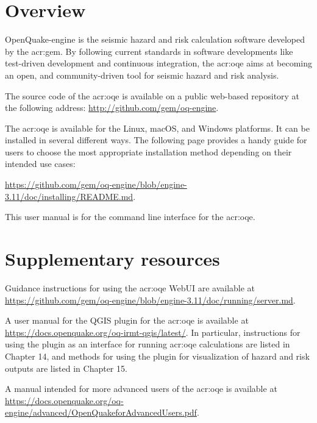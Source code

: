 \section{Overview}

OpenQuake-engine is the seismic hazard and risk calculation software developed by
the \glsdesc{acr:gem}. By following current standards in software
developments like test-driven development and continuous integration, the
\glsdesc{acr:oqe} aims at becoming an open, and community-driven tool for
seismic hazard and risk analysis.

The source code of the \glsdesc{acr:oqe} is available on a public web-based
repository at the following address:
\href{http://github.com/gem/oq-engine}{http://github.com/gem/oq-engine}.

The \glsdesc{acr:oqe} is available for the Linux, macOS, and Windows
platforms. It can be installed in several different ways. The following page
provides a handy guide for users to choose the most appropriate installation
method depending on their intended use cases:

\href{https://github.com/gem/oq-engine/blob/engine-3.11/doc/installing/README.md}{https://github.com/gem/oq-engine/blob/engine-3.11/doc/installing/README.md}.

This user manual is for the command line interface for the \glsdesc{acr:oqe}.


\section{Supplementary resources}

Guidance instructions for using the \glsdesc{acr:oqe} WebUI are available 
at \href{https://github.com/gem/oq-engine/blob/engine-3.11/doc/running/server.md}{https://github.com/gem/oq-engine/blob/engine-3.11/doc/running/server.md}.

A user manual for the QGIS plugin for the \glsdesc{acr:oqe} is available at 
\href{https://docs.openquake.org/oq-irmt-qgis/latest/}{https://docs.openquake.org/oq-irmt-qgis/latest/}. 
In particular, instructions for using the plugin as an interface for running \glsdesc{acr:oqe}
calculations are listed in Chapter 14, and methods for using the plugin for visualization 
of hazard and risk outputs are listed in Chapter 15.

A manual intended for more advanced users of the \glsdesc{acr:oqe} is available
at \href{https://docs.openquake.org/oq-engine/advanced/OpenQuakeforAdvancedUsers.pdf}{https://docs.openquake.org/oq-engine/advanced/OpenQuakeforAdvancedUsers.pdf}.

